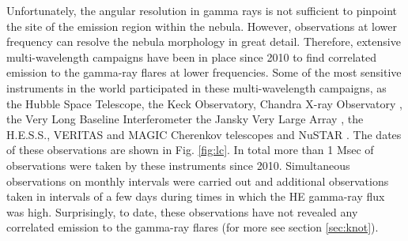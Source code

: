 Unfortunately, the angular resolution in gamma rays is not sufficient to pinpoint the site of the emission region within the nebula. However, observations at lower frequency can resolve the nebula morphology in great detail. Therefore, extensive multi-wavelength campaigns have been in place since 2010 to find correlated emission to the gamma-ray flares at lower frequencies. Some of the most sensitive instruments in the world participated in these multi-wavelength campaigns, as the Hubble Space Telescope, the Keck Observatory, Chandra X-ray Observatory \citep{Weisskopf2013,rudy2015}, the Very Long Baseline Interferometer \citep{Lobanov2011}  the Jansky Very Large Array \citep{Bietenholz2014}, the H.E.S.S., VERITAS and MAGIC Cherenkov telescopes \citep{Abramowski2014,Aliu2014,Aleksic2015} and NuSTAR \citep{Madsen2015}. The dates of these observations are shown in Fig. \ref{fig:lc}. In total more than 1 Msec of observations were taken by these  instruments since 2010. Simultaneous observations on monthly intervals were carried out and additional observations taken in intervals of a few days during times in which the HE gamma-ray flux was high. Surprisingly, to date, these observations have not revealed any correlated emission to the gamma-ray flares (for more see section \ref{sec:knot}). 

